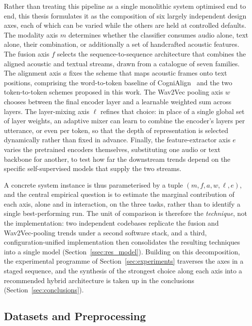 \documentclass[a4paper,12pt]{article}
\begin{document}
Rather than treating this pipeline as a single monolithic system optimised end to end, this thesis formulates it as the composition of six largely independent design axes, each of which can be varied while the others are held at controlled defaults. The modality axis $m$ determines whether the classifier consumes audio alone, text alone, their combination, or additionally a set of handcrafted acoustic features. The fusion axis $f$ selects the sequence-to-sequence architecture that combines the aligned acoustic and textual streams, drawn from a catalogue of seven families. The alignment axis $a$ fixes the scheme that maps acoustic frames onto text positions, comprising the word-to-token baseline of CogniAlign~\cite{ortiz2025cognialign} and the two token-to-token schemes proposed in this work. The Wav2Vec pooling axis $w$ chooses between the final encoder layer and a learnable weighted sum across layers. The layer-mixing axis $\ell$ refines that choice: in place of a single global set of layer weights, an adaptive mixer can learn to combine the encoder's layers per utterance, or even per token, so that the depth of representation is selected dynamically rather than fixed in advance. Finally, the feature-extractor axis $e$ varies the pretrained encoders themselves, substituting one audio or text backbone for another, to test how far the downstream trends depend on the specific self-supervised models that supply the two streams.

A concrete system instance is thus parameterised by a tuple $(m, f, a, w, \ell, e)$, and the central empirical question is to estimate the marginal contribution of each axis, alone and in interaction, on the three tasks, rather than to identify a single best-performing run. The unit of comparison is therefore the \emph{technique}, not the implementation: two independent codebases replicate the fusion and Wav2Vec-pooling trends under a second software stack, and a third, configuration-unified implementation then consolidates the resulting techniques into a single model (Section~\ref{ssec:res_model}). Building on this decomposition, the experimental programme of Section~\ref{sec:experiments} traverses the axes in a staged sequence, and the synthesis of the strongest choice along each axis into a recommended hybrid architecture is taken up in the conclusions (Section~\ref{sec:conclusions}).

\subsection{Datasets and Preprocessing}
\label{ssec:datasets}
\end{document}
